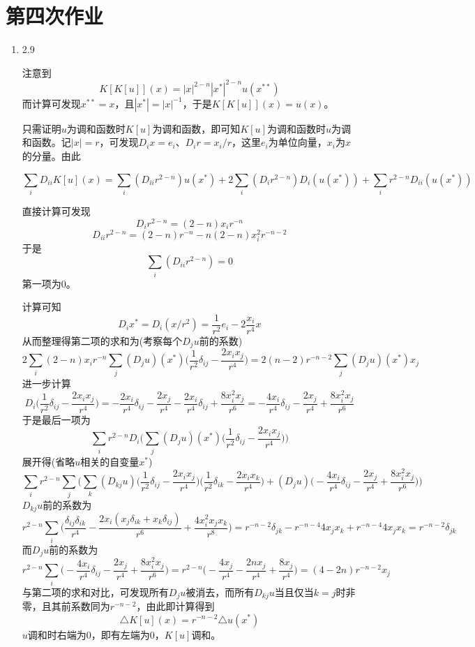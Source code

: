 \documentclass[a4paper,UTF8,fontset=windows,10pt]{ctexart}
\begin{document}
\section{第四次作业}
\begin{enumerate}
    \item 2.9
    
    注意到
    $$K[K[u]](x)=|x|^{2-n}|x^*|^{2-n}u(x^{**})$$
    而计算可发现$x^{**}=x$，且$|x^*|=|x|^{-1}$，于是$K[K[u]](x)=u(x)$。
    
    只需证明$u$为调和函数时$K[u]$为调和函数，即可知$K[u]$为调和函数时$u$为调和函数。记$|x|=r$，可发现$D_ix=e_i$、$D_ir=x_i/r$，这里$e_i$为单位向量，$x_i$为$x$的分量。由此
    
    $$\sum_iD_{ii}K[u](x)=\sum_i(D_{ii}r^{2-n})u(x^*)+2\sum_i(D_ir^{2-n})D_i(u(x^*))+\sum_ir^{2-n}D_{ii}(u(x^*))$$
    
    直接计算可发现
    $$D_ir^{2-n}=(2-n)x_ir^{-n}$$
    $$D_{ii}r^{2-n}=(2-n)r^{-n}-n(2-n)x_i^2r^{-n-2}$$
    于是
    $$\sum_i(D_{ii}r^{2-n})=0$$
    第一项为0。
    
    计算可知
    $$D_ix^*=D_i(x/r^2)=\frac{1}{r^2}e_i-2\frac{x_i}{r^4}x$$
    从而整理得第二项的求和为(考察每个$D_ju$前的系数)
    $$2\sum_i(2-n)x_ir^{-n}\sum_j(D_ju)(x^*)\bigg(\frac{1}{r^2}\delta_{ij}-\frac{2x_ix_j}{r^4}\bigg)=2(n-2)r^{-n-2}\sum_j(D_ju)(x^*)x_j$$
    进一步计算
    $$D_i\bigg(\frac{1}{r^2}\delta_{ij}-\frac{2x_ix_j}{r^4}\bigg)=-\frac{2x_i}{r^4}\delta_{ij}-\frac{2x_j}{r^4}-\frac{2x_i}{r^4}\delta_{ij}+\frac{8x_i^2x_j}{r^6}=-\frac{4x_i}{r^4}\delta_{ij}-\frac{2x_j}{r^4}+\frac{8x_i^2x_j}{r^6}$$
    于是最后一项为
    $$\sum_ir^{2-n}D_i\bigg(\sum_j(D_ju)(x^*)\bigg(\frac{1}{r^2}\delta_{ij}-\frac{2x_ix_j}{r^4}\bigg)\bigg)$$
    展开得(省略$u$相关的自变量$x^*$)
    $$\sum_ir^{2-n}\sum_j\bigg(\sum_k(D_{kj}u)\bigg(\frac{1}{r^2}\delta_{ij}-\frac{2x_ix_j}{r^4}\bigg)\bigg(\frac{1}{r^2}\delta_{ik}-\frac{2x_ix_k}{r^4}\bigg)+(D_ju)\bigg(-\frac{4x_i}{r^4}\delta_{ij}-\frac{2x_j}{r^4}+\frac{8x_i^2x_j}{r^6}\bigg)\bigg)$$
    $D_{kj}u$前的系数为
    $$r^{2-n}\sum_i\bigg(\frac{\delta_{ij}\delta_{ik}}{r^4}-\frac{2x_i(x_j\delta_{ik}+x_k\delta_{ij})}{r^6}+\frac{4x_i^2x_jx_k}{r^8}\bigg)=r^{-n-2}\delta_{jk}-r^{-n-4}4x_jx_k+r^{-n-4}4x_jx_k=r^{-n-2}\delta_{jk}$$
    而$D_ju$前的系数为
    $$r^{2-n}\sum_i\bigg(-\frac{4x_i}{r^4}\delta_{ij}-\frac{2x_j}{r^4}+\frac{8x_i^2x_j}{r^6}\bigg)=r^{2-n}\bigg(-\frac{4x_j}{r^4}-\frac{2nx_j}{r^4}+\frac{8x_j}{r^4}\bigg)=(4-2n)r^{-n-2}x_j$$
    与第二项的求和对比，可发现所有$D_ju$被消去，而所有$D_{kj}u$当且仅当$k=j$时非零，且其前系数同为$r^{-n-2}$，由此即计算得到
    $$\triangle K[u](x)=r^{-n-2}\triangle u(x^*)$$
    $u$调和时右端为0，即有左端为0，$K[u]$调和。
    

\end{enumerate}
\end{document}
